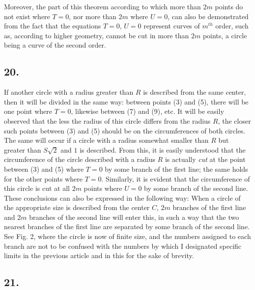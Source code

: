 \documentclass[12pt]{memoir}
\theoremstyle{plain}
\theoremstyle{remark}
\begin{document}
Moreover, the part of this theorem according to which more than \(2m\) points do not exist where \(T=0\), nor more than \(2m\) where \(U = 0\), can also be demonstrated from the fact that the equations \(T = 0\), \(U=0\) represent curves of \(m^{th}\) order, such as, according to higher geometry, cannot be cut in more than \(2m\) points, a circle being a curve of the second order.

\subsection*{20.}

If another circle with a radius greater than \(R\) is described from the same center, then it will be divided in the same way: between points (3) and (5), there will be one point where \(T=0\), likewise between (7) and (9), etc. It will be easily observed that the less the radius of this circle differs from the radius \(R\), the closer such points between (3) and (5) should be on the circumferences of both circles. The same will occur if a circle with a radius somewhat smaller than \(R\) but greater than \(S\surd{2}\) and \(1\) is described. From this, it is easily understood that the circumference of the circle described with a radius \(R\) is actually \textit{cut} at the point between (3) and (5) where \(T=0\) by some branch of the first line; the same holds for the other points where \(T=0\). Similarly, it is evident that the circumference of this circle is cut at all \(2m\) points where \(U=0\) by some branch of the second line. These conclusions can also be expressed in the following way: When a circle of the appropriate size is described from the center \(C\), \(2m\) branches of the first line and \(2m\) branches of the second line will enter this, in such a way that the two nearest branches of the first line are separated by some branch of the second line. See Fig. 2, where the circle is now of finite size, and the numbers assigned to each branch are not to be confused with the numbers by which I designated specific limits in the previous article and in this for the sake of brevity.

\subsection*{21.}
\end{document}
